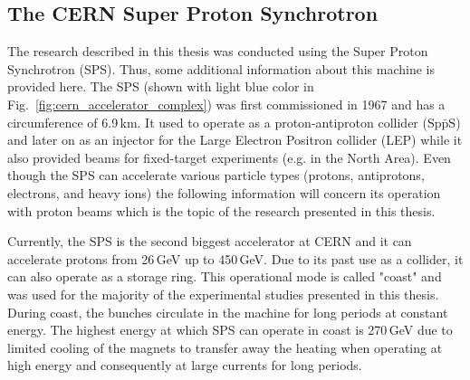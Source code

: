  \subsection{The CERN Super Proton Synchrotron}
 The research described in this thesis was conducted using the Super Proton Synchrotron (SPS). Thus, some additional information about this machine is provided here. The SPS (shown with light blue color in Fig.~\ref{fig:cern_accelerator_complex}) was first commissioned in 1967 and has a circumference of 6.9\,km. It used to operate as a proton-antiproton collider ($\mathrm{Sp\bar{p}S}$) and later on as an injector for the Large Electron Positron collider (LEP) while it also provided beams for fixed-target experiments (e.g. in the North Area). Even though the SPS can accelerate various particle types (protons, antiprotons, electrons, and heavy ions) the following information will concern its operation with proton beams which is the topic of the research presented in this thesis.

 Currently, the SPS is the second biggest accelerator at CERN and it can accelerate protons from 26\,GeV up to 450\,GeV. Due to its past use as a collider, it can also operate as a storage ring. This operational mode is called "coast" and was used for the majority of the experimental studies presented in this thesis. During coast, the bunches circulate in the machine for long periods at constant energy. The highest energy at which SPS can operate in coast is 270\,GeV due to limited cooling of the magnets to transfer away the heating when operating at high energy and consequently at large currents for long periods.

 
